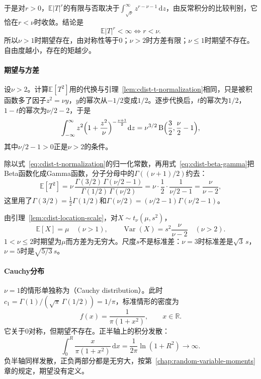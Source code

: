 于是对$r>0$，$\mathbb{E}\lvert T\rvert^{r}$的有限与否取决于$\int_{\sqrt\nu}^{\infty}z^{r-\nu-1}\,\mathrm{d}z$，由反常积分的比较判别，它恰在$r<\nu$时收敛。结论是
\begin{equation}
  \mathbb{E}\lvert T\rvert^{r}<\infty\iff r<\nu .
  \label{eq:cdist-t-moment-existence}
\end{equation}
所以$\nu>1$时期望存在，由对称性等于$0$；$\nu>2$时方差有限；$\nu\leq1$时期望不存在。自由度越小，存在的矩越少。

\paragraph{期望与方差}
设$\nu>2$。计算$\mathbb{E}[T^{2}]$用的代换与引理~\ref{lem:cdist-t-normalization}相同，只是被积函数多了因子$z^{2}=\nu y$，$y$的幂次从$-1/2$变成$1/2$。逐步代换后，$t$的幂次为$1/2$，$1-t$的幂次为$\nu/2-2$，于是
\[
  \int_{-\infty}^{\infty}z^{2}\Bigl(1+\frac{z^{2}}{\nu}\Bigr)^{-\frac{\nu+1}{2}}\mathrm{d}z
  =\nu^{3/2}\,\mathrm{B}\Bigl(\frac32,\frac\nu2-1\Bigr),
\]
其中$\nu/2-1>0$正是$\nu>2$的条件。

除以式~\eqref{eq:cdist-t-normalization}的归一化常数，再用式~\eqref{eq:cdist-beta-gamma}把Beta函数化成Gamma函数，分子分母中的$\Gamma((\nu+1)/2)$约去：
\[
  \mathbb{E}[T^{2}]=\nu\,\frac{\Gamma(3/2)\,\Gamma(\nu/2-1)}{\Gamma(1/2)\,\Gamma(\nu/2)}
  =\nu\cdot\frac12\cdot\frac{1}{\nu/2-1}=\frac{\nu}{\nu-2},
\]
这里用了$\Gamma(3/2)=\frac12\Gamma(1/2)$和$\Gamma(\nu/2)=(\nu/2-1)\Gamma(\nu/2-1)$。

由引理~\ref{lem:cdist-location-scale}，对$X\sim t_{\nu}(\mu,s^{2})$，
\begin{equation}
  \mathbb{E}[X]=\mu\quad(\nu>1),\qquad \operatorname{Var}(X)=s^{2}\frac{\nu}{\nu-2}\quad(\nu>2).
  \label{eq:cdist-t-moments}
\end{equation}
$1<\nu\leq2$时期望为$\mu$而方差为无穷大。尺度$s$不是标准差：$\nu=3$时标准差是$\sqrt3\,s$，$\nu=5$时是$\sqrt{5/3}\,s$。

\paragraph{Cauchy分布}
$\nu=1$的情形单独称为（Cauchy distribution）。此时$c_1=\Gamma(1)/(\sqrt\pi\,\Gamma(1/2))=1/\pi$，标准情形的密度为
\begin{equation}
  f(x)=\frac{1}{\pi(1+x^{2})},\qquad x\in\mathbb{R}.
  \label{eq:cdist-cauchy-density}
\end{equation}
它关于$0$对称，但期望不存在。正半轴上的积分发散：
\[
  \int_0^{R}\frac{x}{\pi(1+x^{2})}\,\mathrm{d}x=\frac{1}{2\pi}\ln(1+R^{2})\to\infty .
\]
负半轴同样发散，正负两部分都是无穷大，按第~\ref{chap:random-variable-moments}章的规定，期望没有定义。

